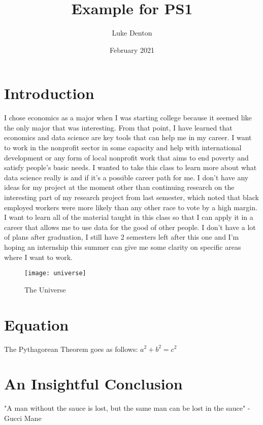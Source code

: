 \documentclass{article}
\title{Example for PS1}
\author{Luke Denton}
\date{February 2021}
\begin{document}
\maketitle
\section{Introduction}
I chose economics as a major when I was starting college because it seemed like the only major that was interesting. From that point, I have learned that economics and data science are key tools that can help me in my career. I want to work in the nonprofit sector in some capacity and help with international development or any form of local nonprofit work that aims to end poverty and satisfy people's basic needs. I wanted to take this class to learn more about what data science really is and if it's a possible career path for me. I don't have any ideas for my project at the moment other than continuing research on the interesting part of my research project from last semester, which noted that black employed workers were more likely than any other race to vote by a high margin. I want to learn all of the material taught in this class so that I can apply it in a career that allows me to use data for the good of other people. I don't have a lot of plans after graduation, I still have 2 semesters left after this one and I'm hoping an internship this summer can give me some clarity on specific areas where I want to work.

\begin{figure}[h!]
\centering
\texttt{[image: universe]}
\caption{The Universe}
\label{fig:universe}
\end{figure}

\section{Equation}
The Pythagorean Theorem goes as follows: \(a^2 + b^2 = c^2\)

\section{An Insightful Conclusion}
"A man without the sauce is lost, but the same man can be lost in the sauce" 
-Gucci Mane
\end{document}

